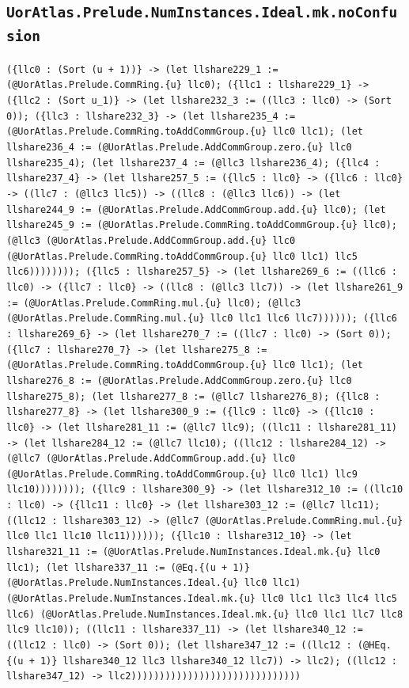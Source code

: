 \documentclass[11pt]{article}
\begin{document}
\subsection*{\texttt{UorAtlas.Prelude.NumInstances.Ideal.mk.noConfusion}}
\noindent\texttt{(\{llc0 : (Sort (u + 1))\} -> (let llshare229\_1 := (@UorAtlas.Prelude.CommRing.\{u\} llc0); (\{llc1 : llshare229\_1\} -> (\{llc2 : (Sort u\_1)\} -> (let llshare232\_3 := ((llc3 : llc0) -> (Sort 0)); (\{llc3 : llshare232\_3\} -> (let llshare235\_4 := (@UorAtlas.Prelude.CommRing.toAddCommGroup.\{u\} llc0 llc1); (let llshare236\_4 := (@UorAtlas.Prelude.AddCommGroup.zero.\{u\} llc0 llshare235\_4); (let llshare237\_4 := (@llc3 llshare236\_4); (\{llc4 : llshare237\_4\} -> (let llshare257\_5 := (\{llc5 : llc0\} -> (\{llc6 : llc0\} -> ((llc7 : (@llc3 llc5)) -> ((llc8 : (@llc3 llc6)) -> (let llshare244\_9 := (@UorAtlas.Prelude.AddCommGroup.add.\{u\} llc0); (let llshare245\_9 := (@UorAtlas.Prelude.CommRing.toAddCommGroup.\{u\} llc0); (@llc3 (@UorAtlas.Prelude.AddCommGroup.add.\{u\} llc0 (@UorAtlas.Prelude.CommRing.toAddCommGroup.\{u\} llc0 llc1) llc5 llc6)))))))); (\{llc5 : llshare257\_5\} -> (let llshare269\_6 := ((llc6 : llc0) -> (\{llc7 : llc0\} -> ((llc8 : (@llc3 llc7)) -> (let llshare261\_9 := (@UorAtlas.Prelude.CommRing.mul.\{u\} llc0); (@llc3 (@UorAtlas.Prelude.CommRing.mul.\{u\} llc0 llc1 llc6 llc7)))))); (\{llc6 : llshare269\_6\} -> (let llshare270\_7 := ((llc7 : llc0) -> (Sort 0)); (\{llc7 : llshare270\_7\} -> (let llshare275\_8 := (@UorAtlas.Prelude.CommRing.toAddCommGroup.\{u\} llc0 llc1); (let llshare276\_8 := (@UorAtlas.Prelude.AddCommGroup.zero.\{u\} llc0 llshare275\_8); (let llshare277\_8 := (@llc7 llshare276\_8); (\{llc8 : llshare277\_8\} -> (let llshare300\_9 := (\{llc9 : llc0\} -> (\{llc10 : llc0\} -> (let llshare281\_11 := (@llc7 llc9); ((llc11 : llshare281\_11) -> (let llshare284\_12 := (@llc7 llc10); ((llc12 : llshare284\_12) -> (@llc7 (@UorAtlas.Prelude.AddCommGroup.add.\{u\} llc0 (@UorAtlas.Prelude.CommRing.toAddCommGroup.\{u\} llc0 llc1) llc9 llc10)))))))); (\{llc9 : llshare300\_9\} -> (let llshare312\_10 := ((llc10 : llc0) -> (\{llc11 : llc0\} -> (let llshare303\_12 := (@llc7 llc11); ((llc12 : llshare303\_12) -> (@llc7 (@UorAtlas.Prelude.CommRing.mul.\{u\} llc0 llc1 llc10 llc11)))))); (\{llc10 : llshare312\_10\} -> (let llshare321\_11 := (@UorAtlas.Prelude.NumInstances.Ideal.mk.\{u\} llc0 llc1); (let llshare337\_11 := (@Eq.\{(u + 1)\} (@UorAtlas.Prelude.NumInstances.Ideal.\{u\} llc0 llc1) (@UorAtlas.Prelude.NumInstances.Ideal.mk.\{u\} llc0 llc1 llc3 llc4 llc5 llc6) (@UorAtlas.Prelude.NumInstances.Ideal.mk.\{u\} llc0 llc1 llc7 llc8 llc9 llc10)); ((llc11 : llshare337\_11) -> (let llshare340\_12 := ((llc12 : llc0) -> (Sort 0)); (let llshare347\_12 := ((llc12 : (@HEq.\{(u + 1)\} llshare340\_12 llc3 llshare340\_12 llc7)) -> llc2); ((llc12 : llshare347\_12) -> llc2))))))))))))))))))))))))))))))}\par
\end{document}
